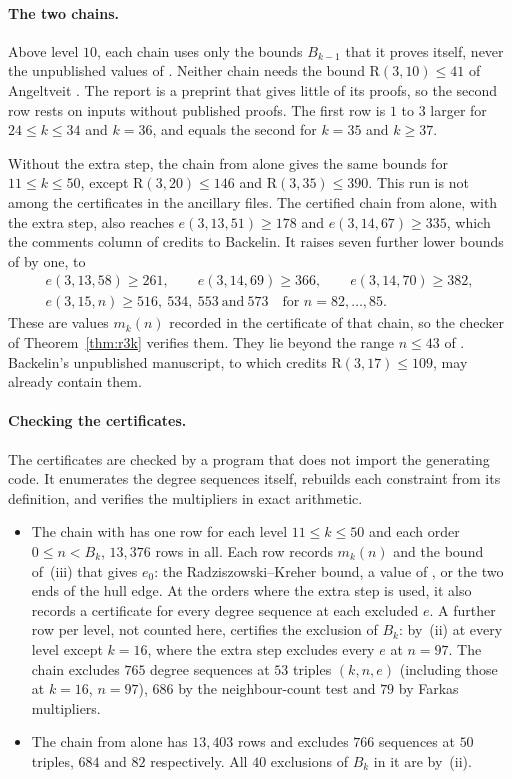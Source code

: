 \documentclass[11pt]{article}
\theoremstyle{spacedplain}
\theoremstyle{spaceddef}
\theoremstyle{spacedremark}
\newcommand{\R}{\mathrm{R}}
\begin{document}
\paragraph{The two chains.}
Above level $10$, each chain uses only the bounds $B_{k-1}$ that it proves itself, never the unpublished values of \cite{Rad26}.
Neither chain needs the bound $\R(3,10)\le 41$ of Angeltveit \cite{Ang25}.
The report \cite{Back3} is a preprint that gives little of its proofs, so the second row rests on inputs without published proofs.
The first row is $1$ to $3$ larger for $24\le k\le 34$ and $k=36$, and equals the second for $k=35$ and $k\ge 37$.

Without the extra step, the chain from \cite{GR13} alone gives the same bounds for $11\le k\le 50$, except $\R(3,20)\le 146$ and $\R(3,35)\le 390$.
This run is not among the certificates in the ancillary files.
The certified chain from \cite{GR13} alone, with the extra step, also reaches $e(3,13,51)\ge 178$ and $e(3,14,67)\ge 335$, which the comments column of \cite[Tables~9 and~10]{GR13} credits to Backelin.
It raises seven further lower bounds of \cite[Tables~9--11]{GR13} by one, to
\begin{gather*}
e(3,13,58)\ge 261,\qquad e(3,14,69)\ge 366,\qquad e(3,14,70)\ge 382,\\
e(3,15,n)\ge 516,\ 534,\ 553\ \text{and}\ 573\quad\text{for } n=82,\dots,85.
\end{gather*}
These are values $m_k(n)$ recorded in the certificate of that chain, so the checker of Theorem~\ref{thm:r3k} verifies them.
They lie beyond the range $n\le 43$ of \cite{Back3}.
Backelin's unpublished manuscript, to which \cite{Rad26} credits $\R(3,17)\le 109$, may already contain them.

\paragraph{Checking the certificates.}
The certificates are checked by a program that does not import the generating code.
It enumerates the degree sequences itself, rebuilds each constraint from its definition, and verifies the multipliers in exact arithmetic.
\begin{itemize}
\item The chain with \cite{Back3} has one row for each level $11\le k\le 50$ and each order $0\le n<B_k$, $13{,}376$ rows in all.
Each row records $m_k(n)$ and the bound of~(iii) that gives $e_0$: the Radziszowski--Kreher bound, a value of \cite{Back3}, or the two ends of the hull edge.
At the orders where the extra step is used, it also records a certificate for every degree sequence at each excluded $e$.
A further row per level, not counted here, certifies the exclusion of $B_k$: by~(ii) at every level except $k=16$, where the extra step excludes every $e$ at $n=97$.
The chain excludes $765$ degree sequences at $53$ triples $(k,n,e)$ (including those at $k=16$, $n=97$), $686$ by the neighbour-count test and $79$ by Farkas multipliers.
\item The chain from \cite{GR13} alone has $13{,}403$ rows and excludes $766$ sequences at $50$ triples, $684$ and $82$ respectively.
All $40$ exclusions of $B_k$ in it are by~(ii).
\end{itemize}
\end{document}
